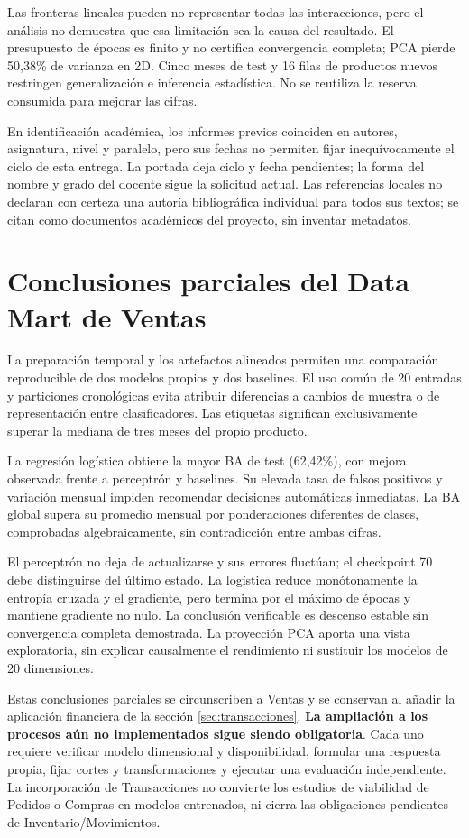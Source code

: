 Las fronteras lineales pueden no representar todas las interacciones, pero el análisis no demuestra que esa limitación sea la causa del resultado. El presupuesto de épocas es finito y no certifica convergencia completa; PCA pierde 50,38\% de varianza en 2D. Cinco meses de test y 16 filas de productos nuevos restringen generalización e inferencia estadística. No se reutiliza la reserva consumida para mejorar las cifras.

En identificación académica, los informes previos coinciden en autores, asignatura, nivel y paralelo, pero sus fechas no permiten fijar inequívocamente el ciclo de esta entrega. La portada deja ciclo y fecha pendientes; la forma del nombre y grado del docente sigue la solicitud actual. Las referencias locales no declaran con certeza una autoría bibliográfica individual para todos sus textos; se citan como documentos académicos del proyecto, sin inventar metadatos.

\section{Conclusiones parciales del Data Mart de Ventas}
La preparación temporal y los artefactos alineados permiten una comparación reproducible de dos modelos propios y dos baselines. El uso común de 20 entradas y particiones cronológicas evita atribuir diferencias a cambios de muestra o de representación entre clasificadores. Las etiquetas significan exclusivamente superar la mediana de tres meses del propio producto.

La regresión logística obtiene la mayor BA de test (62,42\%), con mejora observada frente a perceptrón y baselines. Su elevada tasa de falsos positivos y variación mensual impiden recomendar decisiones automáticas inmediatas. La BA global supera su promedio mensual por ponderaciones diferentes de clases, comprobadas algebraicamente, sin contradicción entre ambas cifras.

El perceptrón no deja de actualizarse y sus errores fluctúan; el checkpoint 70 debe distinguirse del último estado. La logística reduce monótonamente la entropía cruzada y el gradiente, pero termina por el máximo de épocas y mantiene gradiente no nulo. La conclusión verificable es descenso estable sin convergencia completa demostrada. La proyección PCA aporta una vista exploratoria, sin explicar causalmente el rendimiento ni sustituir los modelos de 20 dimensiones.

Estas conclusiones parciales se circunscriben a Ventas y se conservan al añadir la aplicación financiera de la sección \ref{sec:transacciones}. \textbf{La ampliación a los procesos aún no implementados sigue siendo obligatoria}. Cada uno requiere verificar modelo dimensional y disponibilidad, formular una respuesta propia, fijar cortes y transformaciones y ejecutar una evaluación independiente. La incorporación de Transacciones no convierte los estudios de viabilidad de Pedidos o Compras en modelos entrenados, ni cierra las obligaciones pendientes de Inventario/Movimientos.
